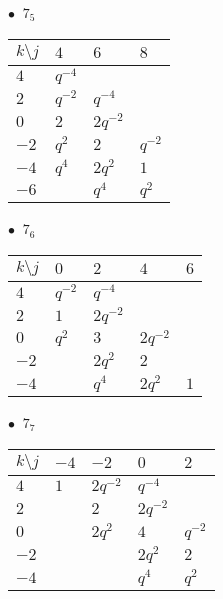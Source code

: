 %
\begin{minipage}{\linewidth}
$\bullet\ $ $7_{5}$ \vspace{0.5em} \\
\begin{tabular}{l|lll}
$k \setminus j$ & $4$ & $6$ & $8$ \\
\hline
$4$ & $q^{-4}$ &  &  \\
$2$ & $q^{-2}$ & $q^{-4}$ &  \\
$0$ & $2$ & $2q^{-2}$ &  \\
$-2$ & $q^{2}$ & $2$ & $q^{-2}$ \\
$-4$ & $q^{4}$ & $2q^{2}$ & $1$ \\
$-6$ &  & $q^{4}$ & $q^{2}$ \\
\end{tabular}
\vspace{2em}
\end{minipage}
%
\begin{minipage}{\linewidth}
$\bullet\ $ $7_{6}$ \vspace{0.5em} \\
\begin{tabular}{l|llll}
$k \setminus j$ & $0$ & $2$ & $4$ & $6$ \\
\hline
$4$ & $q^{-2}$ & $q^{-4}$ &  &  \\
$2$ & $1$ & $2q^{-2}$ &  &  \\
$0$ & $q^{2}$ & $3$ & $2q^{-2}$ &  \\
$-2$ &  & $2q^{2}$ & $2$ &  \\
$-4$ &  & $q^{4}$ & $2q^{2}$ & $1$ \\
\end{tabular}
\vspace{2em}
\end{minipage}
%
\begin{minipage}{\linewidth}
$\bullet\ $ $7_{7}$ \vspace{0.5em} \\
\begin{tabular}{l|llll}
$k \setminus j$ & $-4$ & $-2$ & $0$ & $2$ \\
\hline
$4$ & $1$ & $2q^{-2}$ & $q^{-4}$ &  \\
$2$ &  & $2$ & $2q^{-2}$ &  \\
$0$ &  & $2q^{2}$ & $4$ & $q^{-2}$ \\
$-2$ &  &  & $2q^{2}$ & $2$ \\
$-4$ &  &  & $q^{4}$ & $q^{2}$ \\
\end{tabular}
\vspace{2em}
\end{minipage}
